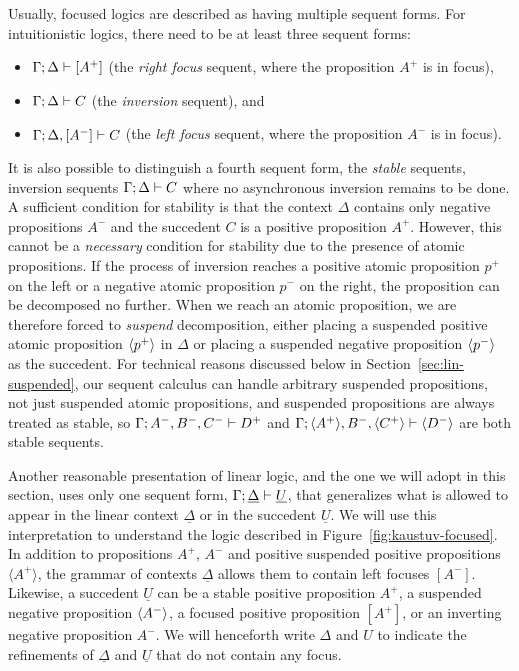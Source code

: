Usually, focused logics are described as having multiple sequent
forms. For intuitionistic logics, there need to be at least three
sequent forms:
\smallskip
\begin{itemize}
\item ${\Gamma};{\Delta} \vdash [{A^+}] \mathstrut$ (the {\it right focus} sequent, where
the proposition $A^+$ is in focus),
\item ${\Gamma};{\Delta} \vdash {C} \mathstrut$ (the {\it inversion} sequent), and
\item ${\Gamma};{\Delta}, [{A^-}] \vdash {C} \mathstrut$ (the {\it left focus} sequent,
where the proposition $A^-$ is in focus).
\end{itemize}
\smallskip
It is also possible to distinguish a fourth sequent form, the {\it
  stable} sequents, inversion sequents ${\Gamma};{\Delta} \vdash {C} \mathstrut$
where no asynchronous inversion remains to be done. A sufficient
condition for stability is that the context $\Delta$ contains only negative 
propositions
$A^-$ and the succedent $C$ is a positive proposition $A^+$.
However, this cannot be a {\it necessary} condition for stability
due to the presence of atomic propositions. 
If the process of inversion reaches a positive atomic
proposition $p^+$ on the left or a negative atomic proposition $p^-$
on the right, the proposition can be decomposed no further. When we
reach an atomic proposition, we are therefore forced to {\it suspend}
decomposition, either placing a suspended positive atomic proposition
$\langle {p^+} \rangle$ in $\Delta$ or placing a suspended negative proposition
$\langle {p^-} \rangle$ as the succedent. For technical reasons discussed below
in Section~\ref{sec:lin-suspended}, our sequent calculus can handle
arbitrary suspended propositions, not just  suspended atomic
propositions, and suspended propositions are always treated as stable,
so ${\Gamma};{A^-, B^-, C^-} \vdash {D^+} \mathstrut$ and
${\Gamma};{\langle {A^+} \rangle, B^-, \langle {C^+} \rangle} \vdash {\langle {D^-} \rangle} \mathstrut$ are both
stable sequents.

Another reasonable presentation of linear logic, and the one we will
adopt in this section, uses only one sequent form,
${\Gamma};{\underline{\Delta}} \vdash {\underline{U}} \mathstrut$, that
generalizes what is allowed to appear in the linear context
$\underline{\Delta}$ or in the succedent $\underline{U}$. We will use
this interpretation to understand the logic described in
Figure~\ref{fig:kaustuv-focused}. In addition to propositions $A^+$,
$A^-$ and positive suspended positive propositions $\langle A^+ \rangle$, 
the grammar
of contexts $\underline{\Delta}$ allows them to contain left focuses
$[ A^- ]$.  Likewise, a succedent $\underline{U}$ can be a stable
positive proposition $A^+$, a suspended negative proposition
$\langle {A^-} \rangle$, a focused positive proposition $[ A^+ ]$, or an
inverting negative proposition $A^-$. We will henceforth write
$\Delta$ and $U$ to indicate the refinements of $\underline{\Delta}$
and $\underline{U}$ that do not contain any focus.

